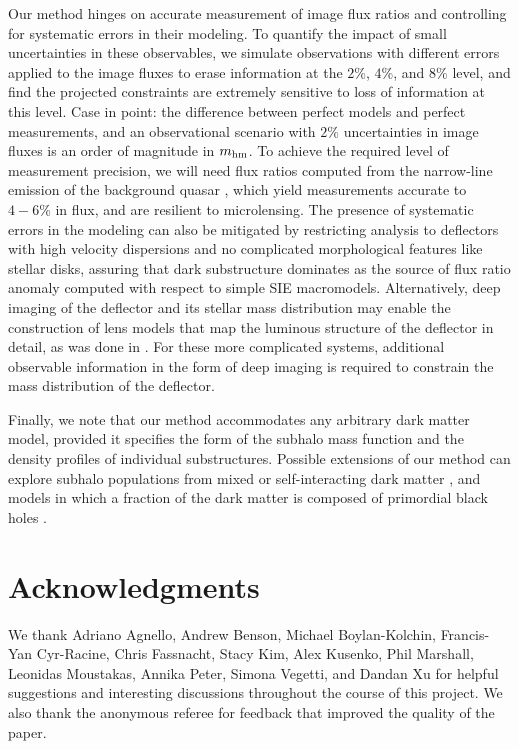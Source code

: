 Our method hinges on accurate measurement of image flux ratios and controlling for systematic errors in their modeling. To quantify the impact of small uncertainties in these observables, we simulate observations with different errors applied to the image fluxes to erase information at the $2\%$, $4\%$, and $8\%$ level, and find the projected constraints are extremely sensitive to loss of information at this level. Case in point: the difference between perfect models and perfect measurements, and an observational scenario with $2\%$ uncertainties in image fluxes is an order of magnitude in $m_{\rm{hm}}$. To achieve the required level of measurement precision, we will need flux ratios computed from the narrow-line emission of the background quasar \citep{Nierenberg++14,Nierenberg++17}, which yield measurements accurate to $4-6\%$ in flux, and are resilient to microlensing. The presence of systematic errors in the modeling can also be mitigated by restricting analysis to deflectors with high velocity dispersions and no complicated morphological features like stellar disks, assuring that dark substructure dominates as the source of flux ratio anomaly computed with respect to simple SIE macromodels. Alternatively, deep imaging of the deflector and its stellar mass distribution may enable the construction of lens models that map the luminous structure of the deflector in detail, as was done in \citet{Hsueh++16,Hsueh++17}. For these more complicated systems, additional observable information in the form of deep imaging is required to constrain the mass distribution of the deflector.

Finally, we note that our method accommodates any arbitrary dark matter model, provided it specifies the form of the subhalo mass function and the density profiles of individual substructures. Possible extensions of our method can explore subhalo populations from mixed or self-interacting dark matter \citep{Rocha++13}, and models in which a fraction of the dark matter is composed of primordial black holes \citep{CotnerKus17}. 

\section*{Acknowledgments}
We thank Adriano Agnello, Andrew Benson, Michael Boylan-Kolchin, Francis-Yan Cyr-Racine, Chris Fassnacht, Stacy Kim, Alex Kusenko, Phil Marshall, Leonidas Moustakas, Annika Peter, Simona Vegetti, and Dandan Xu for helpful suggestions and interesting discussions throughout the course of this project. We also thank the anonymous referee for feedback that improved the quality of the paper.  

